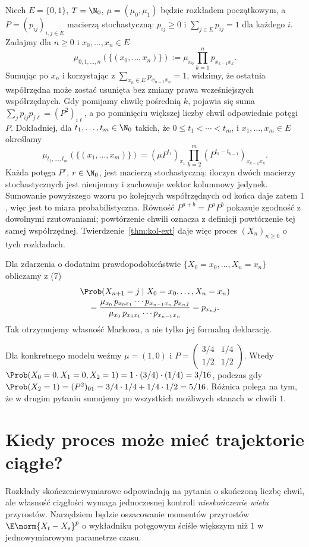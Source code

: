\begin{przyklad}
Niech $E=\{0,1\}$, $T=\N_0$, $\mu=(\mu_0,\mu_1)$
będzie rozkładem początkowym, a
$P=(p_{ij})_{i,j\in E}$ macierzą stochastyczną:
$p_{ij}\ge0$ i $\sum_{j\in E}p_{ij}=1$ dla każdego $i$.
Zadajmy dla $n\ge0$ i $x_0,\ldots,x_n\in E$
\[
\mu_{0,1,\ldots,n}(\{(x_0,\ldots,x_n)\})
:=\mu_{x_0}\prod_{k=1}^n p_{x_{k-1}x_k}.
\tag{7}
\]
Sumując po $x_n$ i korzystając z
$\sum_{x_n\in E}p_{x_{n-1}x_n}=1$, widzimy,
że ostatnia współrzędna może zostać usunięta
bez zmiany prawa wcześniejszych współrzędnych.
Gdy pomijamy chwilę pośrednią $k$, pojawia się suma
$\sum_j p_{ij}p_{j\ell}=(P^2)_{i\ell}$,
a po pominięciu większej liczby chwil
odpowiednie potęgi $P$.
Dokładniej, dla $t_1,\ldots,t_m\in\N_0$ takich, że
$0\le t_1<\cdots<t_m$, i $x_1,\ldots,x_m\in E$ określamy
\[
\mu_{t_1,\ldots,t_m}(\{(x_1,\ldots,x_m)\})
=(\mu P^{t_1})_{x_1}
\prod_{k=2}^m (P^{t_k-t_{k-1}})_{x_{k-1}x_k}.
\]
Każda potęga $P^r$, $r\in\N_0$, jest macierzą stochastyczną:
iloczyn dwóch macierzy stochastycznych jest nieujemny
i zachowuje wektor kolumnowy jedynek. Sumowanie
powyższego wzoru po kolejnych współrzędnych od końca
daje zatem $1$, więc jest to miara probabilistyczna.
Równość $P^{a+b}=P^aP^b$ pokazuje zgodność
z dowolnymi rzutowaniami; powtórzenie chwili
oznacza z definicji powtórzenie tej samej współrzędnej.
Twierdzenie~\ref{thm:kol-ext} daje więc proces
$(X_n)_{n\ge0}$ o tych rozkładach.

Dla zdarzenia o dodatnim prawdopodobieństwie
$\{X_0=x_0,\ldots,X_n=x_n\}$ obliczamy z (7)
\[
\begin{aligned}
&\Prob(X_{n+1}=j\mid X_0=x_0,\ldots,X_n=x_n)\\
&\quad=\frac{\mu_{x_0}\,p_{x_0x_1}\cdots
p_{x_{n-1}x_n}\,p_{x_nj}}
{\mu_{x_0}\,p_{x_0x_1}\cdots p_{x_{n-1}x_n}}
=p_{x_nj}.
\end{aligned}
\]
Tak otrzymujemy własność Markowa, a nie tylko
jej formalną deklarację.

Dla konkretnego modelu weźmy
$\mu=(1,0)$ i
$P=\begin{pmatrix}3/4&1/4\\1/2&1/2\end{pmatrix}$.
Wtedy $\Prob(X_0=0,X_1=0,X_2=1)
=1\cdot(3/4)\cdot(1/4)=3/16$, podczas gdy
$\Prob(X_2=1)=(P^2)_{01}
=3/4\cdot1/4+1/4\cdot1/2=5/16$.
Różnica polega na tym, że w drugim pytaniu
sumujemy po wszystkich możliwych stanach w chwili $1$.
\end{przyklad}

\section{Kiedy proces może mieć trajektorie ciągłe?}
Rozkłady skończeniewymiarowe odpowiadają na pytania o
skończoną liczbę chwil, ale własność ciągłości wymaga
jednoczesnej kontroli \emph{nieskończenie wielu} przyrostów.
Narzędziem będzie oszacowanie momentów przyrostów
$\E\norm{X_t-X_s}^p$ o wykładniku potęgowym ściśle
większym niż $1$ w jednowymiarowym parametrze czasu.

